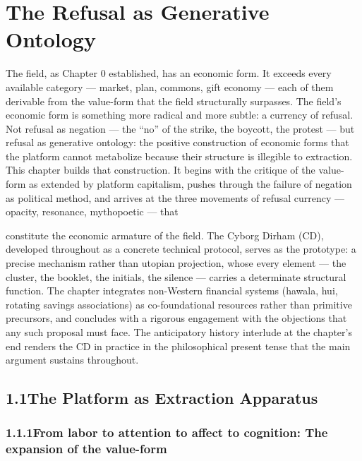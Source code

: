 \chapter{The Refusal as Generative Ontology}
\label{ch:02}

The field, as Chapter 0 established, has an economic form. It exceeds every available category — market, plan, commons, gift economy — each of them derivable from the value-form that the field structurally surpasses. The field’s economic form is something more radical and more subtle: a currency of refusal. Not refusal as negation — the “no” of the strike, the boycott, the protest — but refusal as generative ontology: the positive construction of economic forms that the platform cannot metabolize because their structure is illegible to extraction. This chapter builds that construction. It begins with the critique of the value-form as extended by platform capitalism, pushes through the failure of negation as political method, and arrives at the three movements of refusal currency — opacity, resonance, mythopoetic — that

constitute the economic armature of the field. The Cyborg Dirham (CD), developed throughout as a concrete technical protocol, serves as the prototype: a precise mechanism rather than utopian projection, whose every element — the cluster, the booklet, the initials, the silence — carries a determinate structural function. The chapter integrates non-Western financial systems (hawala, hui, rotating savings associations) as co-foundational resources rather than primitive precursors, and concludes with a rigorous engagement with the objections that any such proposal must face. The anticipatory history interlude at the chapter’s end renders the CD in practice in the philosophical present tense that the main argument sustains throughout.

\section{1.1\quad The Platform as Extraction Apparatus}

\subsection{1.1.1\quad From labor to attention to affect to cognition: The expansion of the value-form}

